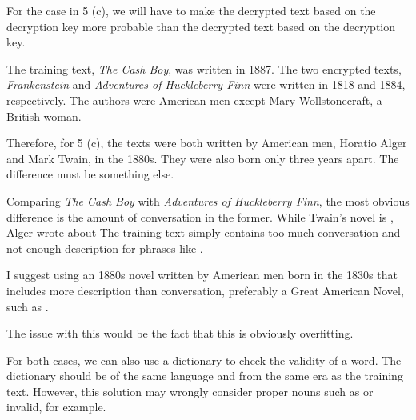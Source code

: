 \documentclass[a4paper,12pt]{exam}
\begin{document}
\begin{questions}
For the case in 5 (c), we will have to make the decrypted text based on the  decryption key more probable than the decrypted text based on the  decryption key.

The training text, \textit{The Cash Boy}, was written in 1887. The two encrypted texts, \textit{Frankenstein} and \textit{Adventures of Huckleberry Finn} were written in 1818 and 1884, respectively. The authors were American men except Mary Wollstonecraft, a British woman.

Therefore, for 5 (c), the texts were both written by American men, Horatio Alger and Mark Twain, in the 1880s. They were also born only three years apart. The difference must be something else.

Comparing \textit{The Cash Boy} with \textit{Adventures of Huckleberry Finn}, the most obvious difference is the amount of conversation in the former. While Twain's novel is , Alger wrote about  The training text simply contains too much conversation and not enough description for phrases like .

I suggest using an 1880s novel written by American men born in the 1830s that includes more description than conversation, preferably a Great American Novel, such as .

The issue with this would be the fact that this is obviously overfitting.

For both cases, we can also use a dictionary to check the validity of a word. The dictionary should be of the same language and from the same era as the training text. However, this solution may wrongly consider proper nouns such as  or  invalid, for example.
\end{questions}
\end{document}
